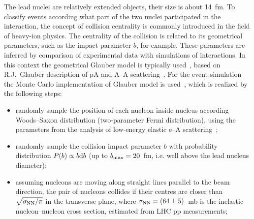The lead nuclei are relatively extended objects, their size is about 14~fm. To classify events according what part of the two nuclei participated in the interaction, the concept of collision centrality is commonly introduced in the field of heavy-ion physics. The centrality of the collision is related to its geometrical parameters, such as the impact parameter $b$, for example. These parameters are inferred by comparison of experimental data with simulations of interactions. In this context the geometrical Glauber model is typically used~\cite{Miller:2007ri}, based on R.J.~Glauber description of pA and A--A scattering~\cite{Glauber:1955qq,Glauber:2006gd}. For the event simulation the Monte Carlo implementation of Glauber model is used~\cite{Shor:1988vk,Alver:2008aq}, which is realized by the following steps:
\begin{itemize}
    \item{randomly sample the position of each nucleon inside nucleus according Woods--Saxon distribution (two-parameter Fermi distribution), using the parameters from the analysis of low-energy elastic e--A scattering~\cite{DeJager:1987qc};}
    \item{randomly sample the collision impact parameter $b$ with probability distribution $P(b) \propto b {\rm d}b$ (up to $b_{\rm max} = 20$~fm, i.e. well above the lead nucleus diameter);}
    \item{assuming nucleons are moving along straight lines parallel to the beam direction, the pair of nucleons collides if their centres are closer than $\sqrt{\sigma_{\rm NN}/\pi}$ in the transverse plane, where $\sigma_{\rm NN} = (64 \pm 5)$~mb is the inelastic nucleon--nucleon cross section, estimated from LHC pp measurements;}
\end{itemize}
